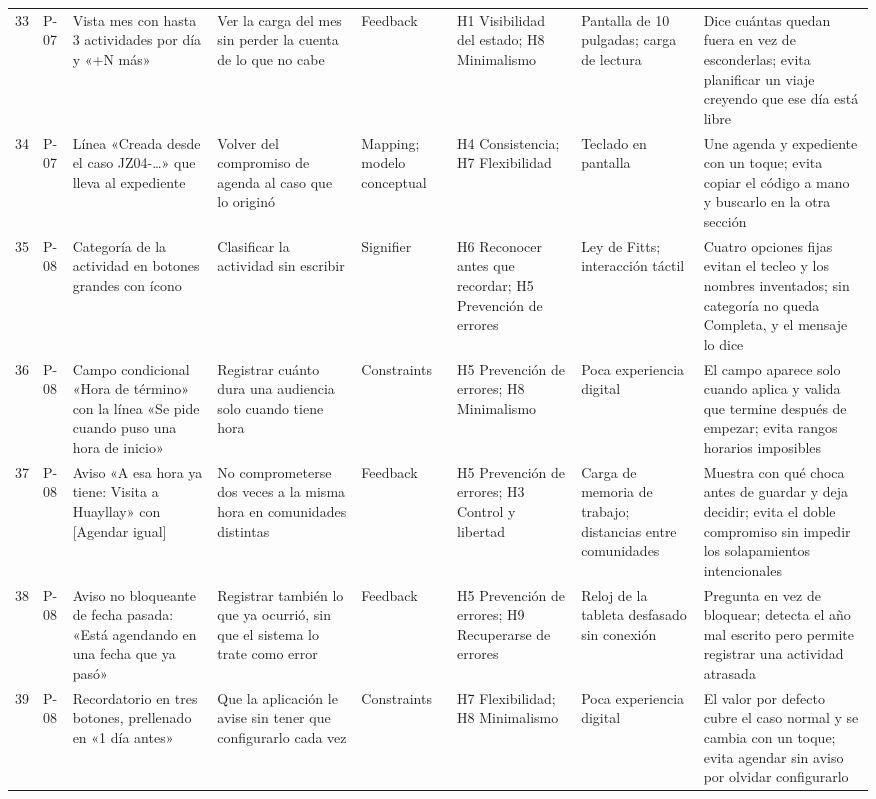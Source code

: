 \begin{longtable}{@{}p{0.6cm}p{1.5cm}p{3.6cm}p{3.4cm}p{2.2cm}p{2.8cm}p{2.3cm}p{4.6cm}@{}}
33 & P-07 & Vista mes con hasta 3 actividades por día y «+N más» & Ver la carga del mes sin perder la cuenta de lo que no cabe & Feedback & H1 Visibilidad del estado; H8 Minimalismo & Pantalla de 10 pulgadas; carga de lectura & Dice cuántas quedan fuera en vez de esconderlas; evita planificar un viaje creyendo que ese día está libre \\
34 & P-07 & Línea «Creada desde el caso JZ04-…» que lleva al expediente & Volver del compromiso de agenda al caso que lo originó & Mapping; modelo conceptual & H4 Consistencia; H7 Flexibilidad & Teclado en pantalla & Une agenda y expediente con un toque; evita copiar el código a mano y buscarlo en la otra sección \\
35 & P-08 & Categoría de la actividad en botones grandes con ícono & Clasificar la actividad sin escribir & Signifier & H6 Reconocer antes que recordar; H5 Prevención de errores & Ley de Fitts; interacción táctil & Cuatro opciones fijas evitan el tecleo y los nombres inventados; sin categoría no queda Completa, y el mensaje lo dice \\
36 & P-08 & Campo condicional «Hora de término» con la línea «Se pide cuando puso una hora de inicio» & Registrar cuánto dura una audiencia solo cuando tiene hora & Constraints & H5 Prevención de errores; H8 Minimalismo & Poca experiencia digital & El campo aparece solo cuando aplica y valida que termine después de empezar; evita rangos horarios imposibles \\
37 & P-08 & Aviso «A esa hora ya tiene: Visita a Huayllay» con [Agendar igual] & No comprometerse dos veces a la misma hora en comunidades distintas & Feedback & H5 Prevención de errores; H3 Control y libertad & Carga de memoria de trabajo; distancias entre comunidades & Muestra con qué choca antes de guardar y deja decidir; evita el doble compromiso sin impedir los solapamientos intencionales \\
38 & P-08 & Aviso no bloqueante de fecha pasada: «Está agendando en una fecha que ya pasó» & Registrar también lo que ya ocurrió, sin que el sistema lo trate como error & Feedback & H5 Prevención de errores; H9 Recuperarse de errores & Reloj de la tableta desfasado sin conexión & Pregunta en vez de bloquear; detecta el año mal escrito pero permite registrar una actividad atrasada \\
39 & P-08 & Recordatorio en tres botones, prellenado en «1 día antes» & Que la aplicación le avise sin tener que configurarlo cada vez & Constraints & H7 Flexibilidad; H8 Minimalismo & Poca experiencia digital & El valor por defecto cubre el caso normal y se cambia con un toque; evita agendar sin aviso por olvidar configurarlo \\

\end{longtable}

